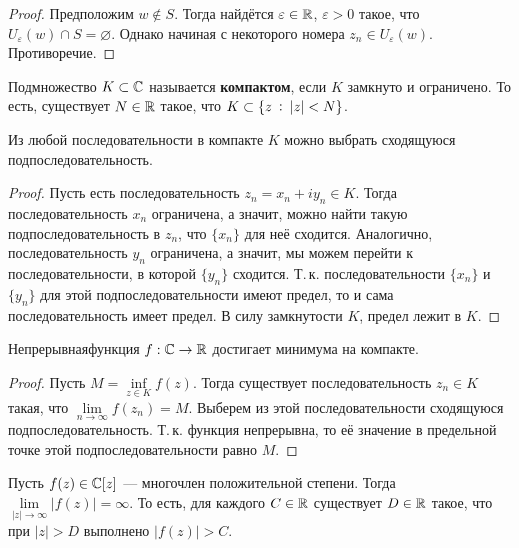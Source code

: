 \begin{proof}
    Предположим $w \notin S$. Тогда найдётся $\varepsilon \in \mathbb{R}$, $\varepsilon > 0$ такое, что $U_\varepsilon(w) \cap S = \varnothing$. Однако начиная с некоторого номера $z_n \in U_\varepsilon(w)$. Противоречие.
\end{proof}

\begin{definition}
    Подмножество $K \subset \mathbb{C}$ называется \textbf{компактом}, если $K$ замкнуто и ограничено. То есть, существует $N \in \mathbb{R}$ такое, что $K \subset \{z\:\vcentcolon\:|z| < N\}$.
\end{definition}

\begin{lemma}
    Из любой последовательности в компакте $K$ можно выбрать сходящуюся подпоследовательность.
\end{lemma}

\begin{proof}
    Пусть есть последовательность $z_n = x_n + iy_n \in K$. Тогда последовательность $x_n$ ограничена, а значит, можно найти такую подпоследовательность в $z_n$, что $\{x_n\}$ для неё сходится. Аналогично, последовательность $y_n$ ограничена, а значит, мы можем перейти к последовательности, в которой $\{y_n\}$ сходится. Т.\,к. последовательности $\{x_n\}$ и $\{y_n\}$ для этой подпоследовательности имеют предел, то и сама последовательность имеет предел. В силу замкнутости $K$, предел лежит в $K$.
\end{proof}

\begin{theorem}
    Непрерывнаяфункция $f: \mathbb{C} \rightarrow \mathbb{R}$ достигает минимума на компакте.
\end{theorem}

\begin{proof}
    Пусть $M = \inf\limits_{z \in K}f(z)$. Тогда существует последовательность $z_n \in K$ такая, что $\lim\limits_{n \rightarrow \infty}f(z_n) = M$. Выберем из этой последовательности сходящуюся подпоследовательность. Т.\,к. функция непрерывна, то её значение в предельной точке этой подпоследовательности равно $M$.
\end{proof}

\begin{lemma}
    Пусть $f(z) \in \mathbb{C}[z]$ --- многочлен положительной степени. Тогда $\lim\limits_{|z| \rightarrow \infty}|f(z)| = \infty$. То есть, для каждого $C \in \mathbb{R}$ существует $D \in \mathbb{R}$ такое, что при $|z| > D$ выполнено $|f(z)| > C$.
\end{lemma}

